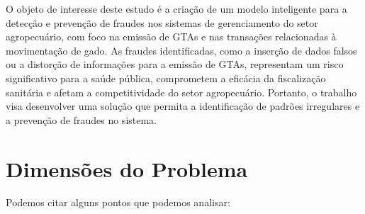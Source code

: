 O objeto de interesse deste estudo é a criação de um modelo inteligente para a detecção e prevenção de fraudes nos sistemas de gerenciamento do setor agropecuário, com foco na emissão de GTAs e nas transações relacionadas à movimentação de gado. As fraudes identificadas, como a inserção de dados falsos ou a distorção de informações para a emissão de GTAs, representam um risco significativo para a saúde pública, comprometem a eficácia da fiscalização sanitária e afetam a competitividade do setor agropecuário. Portanto, o trabalho visa desenvolver uma solução que permita a identificação de padrões irregulares e a prevenção de fraudes no sistema.

\section{Dimensões do Problema}

Podemos citar alguns pontos que podemos analisar: 

